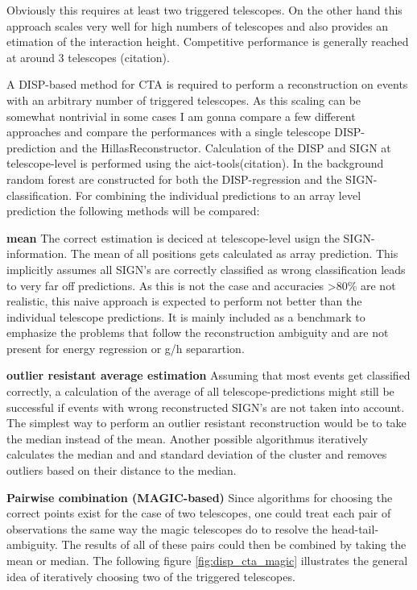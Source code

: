 Obviously this requires at least two triggered telescopes.
On the other hand this approach scales
very well for high numbers of telescopes and
also provides an etimation of the interaction height.
Competitive performance is generally reached
at around 3 telescopes (citation).


A DISP-based method for CTA is required to perform a reconstruction on
events with an arbitrary number of triggered telescopes.
As this scaling can be somewhat nontrivial in some cases I am gonna
compare a few different approaches and compare the performances
with a single telescope DISP-prediction and the HillasReconstructor.
Calculation of the DISP and SIGN at
telescope-level is performed using the aict-tools(citation).
In the background random forest are constructed for both the
DISP-regression and the SIGN-classification.
For combining the individual predictions to an array level prediction
the following methods will be compared:

\textbf{mean}
The correct estimation is deciced at telescope-level usign the
SIGN-information. The mean of all positions gets calculated as
array prediction.
This implicitly assumes all SIGN's are correctly classified as
wrong classification leads to very far off predictions.
As this is not the case and accuracies >80\% are not realistic,
this naive approach is expected to perform not better than the individual
telescope predictions.
It is mainly included as a benchmark to emphasize the problems
that follow the reconstruction ambiguity and are not present for
energy regression or g/h separartion.


\textbf{outlier resistant average estimation}
Assuming that most events get classified correctly, a calculation of
the average of all telescope-predictions might still be successful if
events with wrong reconstructed SIGN's are not taken into account.
The simplest way to perform an outlier resistant reconstruction
would be to take the median instead of the mean.
Another possible algorithmus iteratively calculates
the median and and standard deviation of the cluster and removes
outliers based on their distance to the median.

\textbf{Pairwise combination (MAGIC-based)}
Since algorithms for choosing the correct points exist for the
case of two telescopes, one could treat each pair of observations 
the same way the magic telescopes do to resolve the head-tail-ambiguity.
The results of all of these pairs could then be combined by taking the mean 
or median.
The following figure \ref{fig:disp_cta_magic} illustrates the general idea of iteratively 
choosing two of the triggered telescopes.

